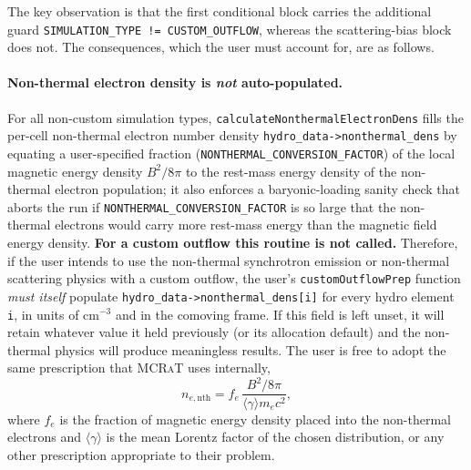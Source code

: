 \documentclass[12pt,a4paper]{article}
\newcommand{\mcrat}{\textsc{MCRaT}}
\begin{document}
The key observation is that the first conditional block carries the additional guard \texttt{SIMULATION\_TYPE != CUSTOM\_OUTFLOW}, whereas the scattering-bias block does not. The consequences, which the user must account for, are as follows.

\paragraph{Non-thermal electron density is \emph{not} auto-populated.}
For all non-custom simulation types, \texttt{calculateNonthermalElectronDens} fills the per-cell non-thermal electron number density \texttt{hydro\_data->nonthermal\_dens} by equating a user-specified fraction (\texttt{NONTHERMAL\_CONVERSION\_FACTOR}) of the local magnetic energy density $B^2/8\pi$ to the rest-mass energy density of the non-thermal electron population; it also enforces a baryonic-loading sanity check that aborts the run if \texttt{NONTHERMAL\_CONVERSION\_FACTOR} is so large that the non-thermal electrons would carry more rest-mass energy than the magnetic field energy density. \textbf{For a custom outflow this routine is not called.} Therefore, if the user intends to use the non-thermal synchrotron emission or non-thermal scattering physics with a custom outflow, the user's \texttt{customOutflowPrep} function \emph{must itself} populate \texttt{hydro\_data->nonthermal\_dens[i]} for every hydro element \texttt{i}, in units of cm$^{-3}$ and in the comoving frame. If this field is left unset, it will retain whatever value it held previously (or its allocation default) and the non-thermal physics will produce meaningless results. The user is free to adopt the same prescription that \mcrat{} uses internally,
\[
n_{e,\mathrm{nth}}=f_e\,\frac{B^2/8\pi}{\langle\gamma\rangle m_e c^2},
\]
where $f_e$ is the fraction of magnetic energy density placed into the non-thermal electrons and $\langle\gamma\rangle$ is the mean Lorentz factor of the chosen distribution, or any other prescription appropriate to their problem.
\end{document}
